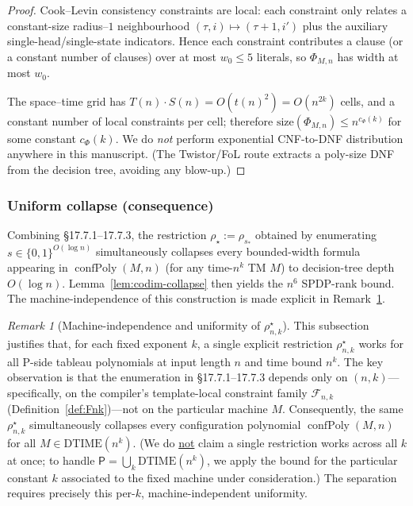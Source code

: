\documentclass[12pt]{article}
\theoremstyle{definition}
\theoremstyle{definition}
\theoremstyle{remark}
\newtheorem{remark}{Remark}
\theoremstyle{remark}
\begin{document}
\begin{proof}
Cook--Levin consistency constraints are local: each constraint only relates a constant-size
radius--$1$ neighbourhood $(\tau,i)\mapsto(\tau+1,i')$ plus the auxiliary single-head/single-state
indicators. Hence each constraint contributes a clause (or a constant number of clauses)
over at most $w_0\le 5$ literals, so $\Phi_{M,n}$ has width at most $w_0$.

The space--time grid has $T(n)\cdot S(n)=O(t(n)^2)=O(n^{2k})$ cells, and a constant number
of local constraints per cell; therefore $\mathrm{size}(\Phi_{M,n})\le n^{c_\Phi(k)}$ for some constant
$c_\Phi(k)$.
We do \emph{not} perform exponential CNF-to-DNF distribution anywhere in this manuscript.
(The Twistor/FoL route extracts a poly-size DNF from the decision tree, avoiding any blow-up.)
\end{proof}

\subsubsection{Uniform collapse (consequence)}

Combining \S17.7.1--17.7.3, the restriction $\rho_\star:=\rho_{s_*}$ obtained by enumerating $s\in\{0,1\}^{O(\log n)}$ simultaneously collapses every bounded-width formula appearing in $\operatorname{confPoly}(M,n)$ (for any time-$n^k$ TM $M$) to decision-tree depth $O(\log n)$. Lemma~\ref{lem:codim-collapse} then yields the $n^6$ SPDP-rank bound. The machine-independence of this construction is made explicit in Remark~\ref{rem:rhostar-uniform}.

\begin{remark}[Machine-independence and uniformity of $\rho^\star_{n,k}$]
\label{rem:rhostar-uniform}
This subsection justifies that, for each fixed exponent $k$, a single explicit restriction $\rho^\star_{n,k}$ works for all P-side tableau polynomials at input length $n$ and time bound $n^k$. The key observation is that the enumeration in \S17.7.1--17.7.3 depends only on $(n,k)$---specifically, on the compiler's template-local constraint family $\mathcal{F}_{n,k}$ (Definition~\ref{def:Fnk})---not on the particular machine $M$. Consequently, the same $\rho^\star_{n,k}$ simultaneously collapses every configuration polynomial $\operatorname{confPoly}(M,n)$ for all $M\in\mathrm{DTIME}(n^k)$. (We do \underline{not} claim a single restriction works across all $k$ at once; to handle $\mathsf{P}=\bigcup_k\mathrm{DTIME}(n^k)$, we apply the bound for the particular constant $k$ associated to the fixed machine under consideration.) The separation requires precisely this per-$k$, machine-independent uniformity.
\end{remark}
\end{document}
